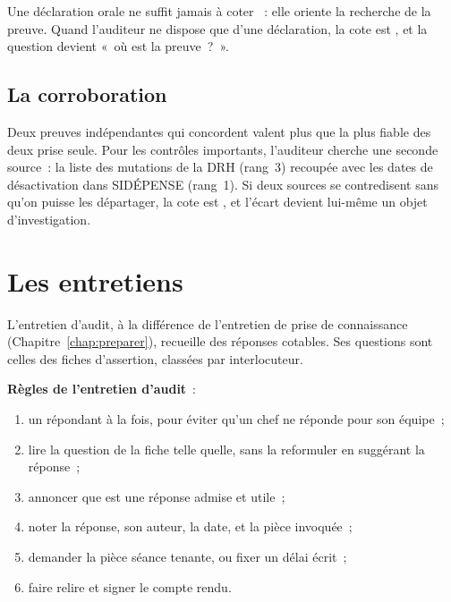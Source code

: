Une déclaration orale ne suffit jamais à coter \OUI{}~: elle oriente la
recherche de la preuve. Quand l'auditeur ne dispose que d'une déclaration,
la cote est \NEK{}, et la question devient «~où est la preuve~?~».

\subsection{La corroboration}

Deux preuves indépendantes qui concordent valent plus que la plus fiable
des deux prise seule. Pour les contrôles importants, l'auditeur cherche une
seconde source~: la liste des mutations de la DRH (rang~3) recoupée avec
les dates de désactivation dans SIDÉPENSE (rang~1). Si deux sources se
contredisent sans qu'on puisse les départager, la cote est \NEK{}, et
l'écart devient lui-même un objet d'investigation.

\separateur

\section{Les entretiens}
\label{sec:c07-entretiens}

L'entretien d'audit, à la différence de l'entretien de prise de
connaissance (Chapitre~\ref{chap:preparer}), recueille des réponses
cotables. Ses questions sont celles des fiches d'assertion, classées par
interlocuteur.

\begin{boxprocedure}
\textbf{Règles de l'entretien d'audit}~:
\begin{enumerate}
    \item un répondant à la fois, pour éviter qu'un chef ne réponde pour son
          équipe~;
    \item lire la question de la fiche telle quelle, sans la reformuler en
          suggérant la réponse~;
    \item annoncer que \NEK{} est une réponse admise et utile~;
    \item noter la réponse, son auteur, la date, et la pièce invoquée~;
    \item demander la pièce séance tenante, ou fixer un délai écrit~;
    \item faire relire et signer le compte rendu.
\end{enumerate}
\end{boxprocedure}

